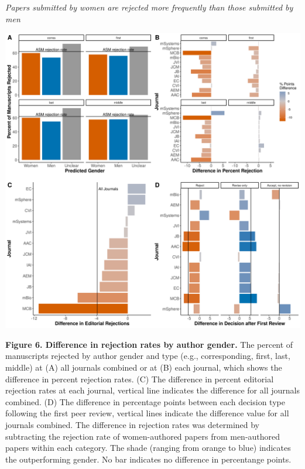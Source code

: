 \documentclass[11pt,]{article}
\begin{document}
\emph{Papers submitted by women are rejected more frequently than those
submitted by men}

\includegraphics{Figure_6.png}

\textbf{Figure 6. Difference in rejection rates by author gender.} The
percent of manuscripts rejected by author gender and type (e.g.,
corresponding, first, last, middle) at (A) all journals combined or at
(B) each journal, which shows the difference in percent rejection rates.
(C) The difference in percent editorial rejection rates at each journal,
vertical line indicates the difference for all journals combined. (D)
The difference in percentage points between each decision type following
the first peer review, vertical lines indicate the difference value for
all journals combined. The difference in rejection rates was determined
by subtracting the rejection rate of women-authored papers from
men-authored papers within each category. The shade (ranging from orange
to blue) indicates the outperforming gender. No bar indicates no
difference in percentange points.
\end{document}
